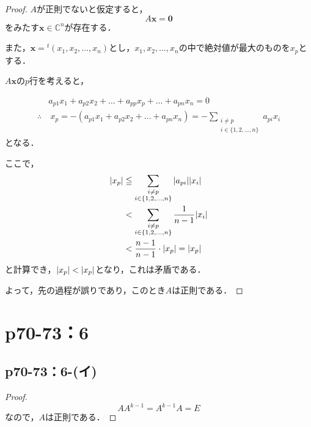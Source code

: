 \documentclass[a4paper,10pt,fleqn]{ltjsarticle}
\begin{document}
\begin{leftbar}
    \begin{proof}
        $A$が正則でないと仮定すると，
        \[
            A \bm{x} = \bm{0}
        \]
        をみたす$\bm{x} \in \mathbb{C}^n$が存在する．

        また，$\bm{x} ={} ^t (x_1,x_2,\dots,x_n)$とし，$x_1,x_2,\dots,x_n$の中で絶対値が最大のものを$x_p$とする．

        $A \bm{x}$の$p$行を考えると，

        \begin{align*}
                       & a_{p1} x_1 + a_{p2} x_2 + \dots + a_{pp} x_p + \dots + a_{pn} x_n = 0            \\
            \therefore & ~ x_p = -(a_{p1}x_1 + a_{p2} x_2+ \dots + a_{pn} x_n) =- \sum_{\substack{i \ne p \\ i \in \{1,2,\dots,n\}}} a_{pi} x_i
        \end{align*}
        となる．

        ここで，
        \begin{align*}
            \abs{x_p} & \leqq \sum_{\substack{i \ne p                \\ i \in \{1,2,\dots,n\}}} \abs{a_{pi}} \abs{x_i} \\
                      & < \sum_{\substack{i \ne p                    \\ i \in \{1,2,\dots,n\}}} \frac{1}{n-1} \abs{x_i} \\
                      & < \frac{n-1}{n-1} \cdot \abs{x_p} =\abs{x_p}
        \end{align*}
        と計算でき，$ \abs{x_p} < \abs{x_p}$となり，これは矛盾である．

        よって，先の過程が誤りであり，このとき$A$は正則である．
    \end{proof}
\end{leftbar}
\newpage

\section*{p70-73：6}

\subsection*{p70-73：6-(イ)}
\begin{tleftbar}
    \begin{proof}
        \[
            A A^{k-1} = A^{k-1} A = E
        \]
        なので，$A$は正則である．
    \end{proof}
\end{tleftbar}
\end{document}
